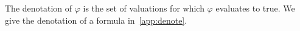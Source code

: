 The denotation of $\varphi$ is the set of valuations for which $\varphi$ evaluates to true. We give the denotation of a formula in~\autoref{app:denote}.







